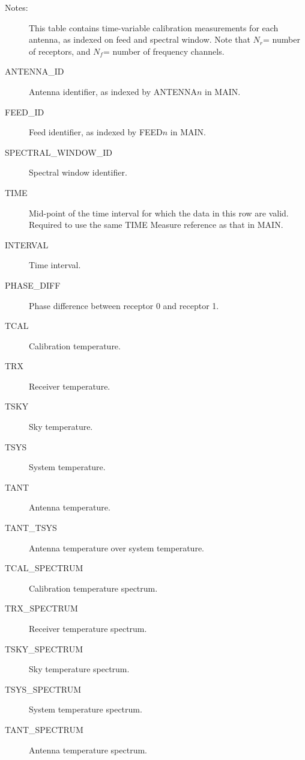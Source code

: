 \documentclass{article}
\newcommand{\nr}{$N_r$}
\newcommand{\nf}{$N_f$}
\begin{document}
\begin{description}

\item[Notes:] This table contains time-variable calibration
measurements for each antenna, as indexed on feed and spectral window.
Note that \nr = number of receptors, and \nf = number of
frequency channels.

\item[ANTENNA\_ID] Antenna identifier, as indexed by ANTENNA$n$ in MAIN.

\item[FEED\_ID] Feed identifier, as indexed by FEED$n$ in MAIN.

\item[SPECTRAL\_WINDOW\_ID] Spectral window identifier.

\item[TIME] Mid-point of the time interval for which the data in this
row are valid. Required to use the same TIME Measure reference as that
in MAIN.

\item[INTERVAL] Time interval.

\item[PHASE\_DIFF] Phase difference between receptor 0 and receptor 1.

\item[TCAL] Calibration temperature.

\item[TRX] Receiver temperature.

\item[TSKY] Sky temperature.

\item[TSYS] System temperature.

\item[TANT] Antenna temperature.

\item[TANT\_TSYS] Antenna temperature over system temperature.

\item[TCAL\_SPECTRUM] Calibration temperature spectrum.

\item[TRX\_SPECTRUM] Receiver temperature spectrum.

\item[TSKY\_SPECTRUM] Sky temperature spectrum.

\item[TSYS\_SPECTRUM] System temperature spectrum.

\item[TANT\_SPECTRUM] Antenna temperature spectrum.


\end{description}
\end{document}
